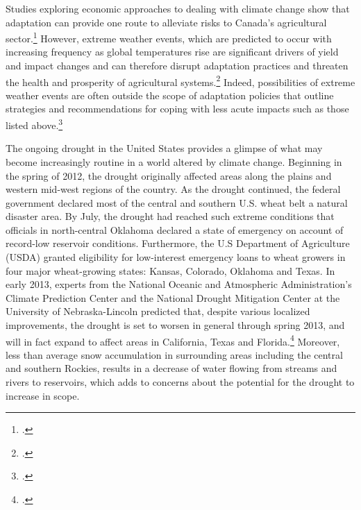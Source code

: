 Studies exploring economic approaches to dealing with climate change show that adaptation can provide one route to alleviate risks to Canada's agricultural sector.\footcite{Amiraslany2010}
However, extreme weather events, which are predicted to occur with increasing frequency as global temperatures rise are significant drivers of yield and impact changes and can therefore disrupt adaptation practices and threaten the health and prosperity of agricultural systems.\footcite{IsikDevadoss2006}
Indeed, possibilities of extreme weather events are often outside the scope of adaptation policies that outline strategies and recommendations for coping with less acute impacts such as those listed above.\footcite[See for instance:][]{Malcolm2012}


The ongoing drought in the United States provides a glimpse of what may become increasingly routine in a world altered by climate change.
Beginning in the spring of 2012, the drought originally affected areas along the plains and western mid-west regions of the country. 
As the drought continued, the federal government declared most of the central and southern U.S. wheat belt a natural disaster area. 
By July, the drought had reached such extreme conditions that officials in north-central Oklahoma declared a state of emergency on account of record-low reservoir conditions. 
Furthermore, the U.S Department of Agriculture (USDA) granted eligibility for low-interest emergency loans to wheat growers in four major wheat-growing states: Kansas, Colorado, Oklahoma and Texas. 
In early 2013, experts from the National Oceanic and Atmospheric Administration's Climate Prediction Center and the National Drought Mitigation Center at the University of Nebraska-Lincoln predicted that, despite various localized improvements, the drought is set to worsen in general through spring 2013, and will in fact expand to affect areas in California, Texas and Florida.\footcite[][]{NOAAteleconf2013}
Moreover, less than average snow accumulation in surrounding areas including the central and southern Rockies, results in a decrease of water flowing from streams and rivers to reservoirs, which adds to concerns about the potential for the drought to increase in scope.



